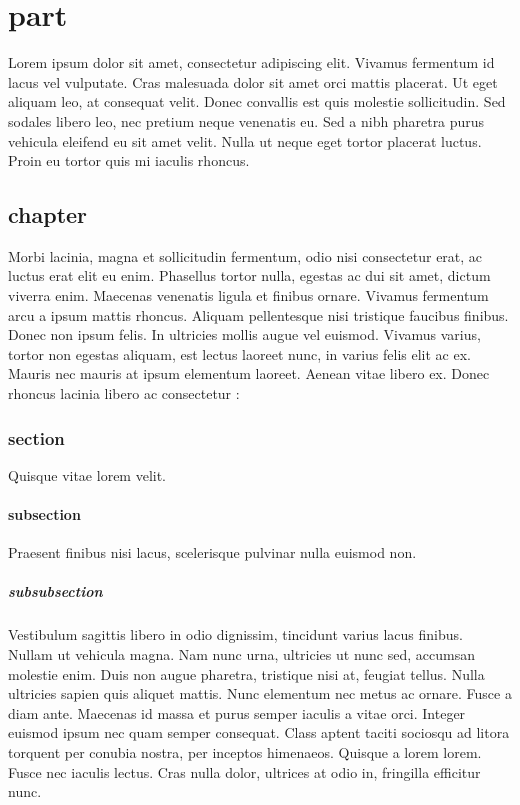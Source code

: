 \documentclass{book}
\begin{document}
\part{part}

Lorem ipsum dolor sit amet, consectetur adipiscing elit. Vivamus fermentum id lacus vel vulputate. Cras malesuada dolor sit amet orci mattis placerat. Ut eget aliquam leo, at consequat velit. Donec convallis est quis molestie sollicitudin. Sed sodales libero leo, nec pretium neque venenatis eu. Sed a nibh pharetra purus vehicula eleifend eu sit amet velit. Nulla ut neque eget tortor placerat luctus. Proin eu tortor quis mi iaculis rhoncus.

\chapter{chapter}

Morbi lacinia, magna et sollicitudin fermentum, odio nisi consectetur erat, ac luctus erat elit eu enim. Phasellus tortor nulla, egestas ac dui sit amet, dictum viverra enim. Maecenas venenatis ligula et finibus ornare. Vivamus fermentum arcu a ipsum mattis rhoncus. Aliquam pellentesque nisi tristique faucibus finibus. Donec non ipsum felis. In ultricies mollis augue vel euismod. Vivamus varius, tortor non egestas aliquam, est lectus laoreet nunc, in varius felis elit ac ex. Mauris nec mauris at ipsum elementum laoreet. Aenean vitae libero ex. Donec rhoncus lacinia libero ac consectetur :

\section{section}

Quisque vitae lorem velit.

\subsection{subsection}

Praesent finibus nisi lacus, scelerisque pulvinar nulla euismod non.

\subsubsection{subsubsection}

Vestibulum sagittis libero in odio dignissim, tincidunt varius lacus finibus. Nullam ut vehicula magna. Nam nunc urna, ultricies ut nunc sed, accumsan molestie enim. Duis non augue pharetra, tristique nisi at, feugiat tellus. Nulla ultricies sapien quis aliquet mattis. Nunc elementum nec metus ac ornare. Fusce a diam ante. Maecenas id massa et purus semper iaculis a vitae orci. Integer euismod ipsum nec quam semper consequat. Class aptent taciti sociosqu ad litora torquent per conubia nostra, per inceptos himenaeos. Quisque a lorem lorem. Fusce nec iaculis lectus. Cras nulla dolor, ultrices at odio in, fringilla efficitur nunc.
\end{document}
